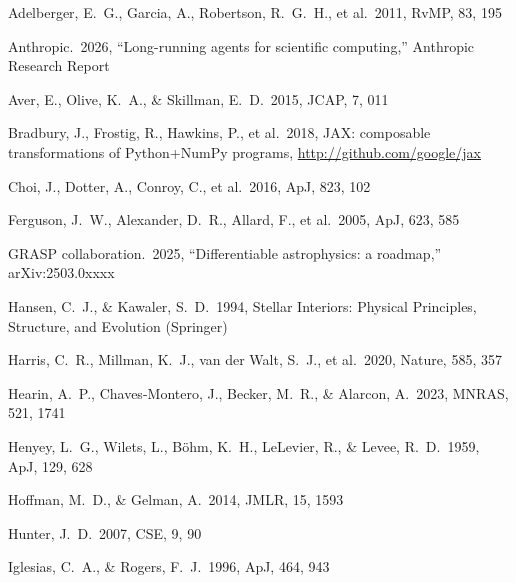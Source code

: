 \documentclass[twocolumn]{aastex631}
\begin{document}
\begin{thebibliography}{}

Adelberger, E.~G., Garcia, A., Robertson, R.~G.~H., et al.\ 2011, RvMP, 83, 195

Anthropic.\ 2026, ``Long-running agents for scientific computing,'' Anthropic Research Report

Aver, E., Olive, K.~A., \& Skillman, E.~D.\ 2015, JCAP, 7, 011

Bradbury, J., Frostig, R., Hawkins, P., et al.\ 2018, JAX: composable transformations of Python+NumPy programs, \url{http://github.com/google/jax}

Choi, J., Dotter, A., Conroy, C., et al.\ 2016, ApJ, 823, 102

Ferguson, J.~W., Alexander, D.~R., Allard, F., et al.\ 2005, ApJ, 623, 585

GRASP collaboration.\ 2025, ``Differentiable astrophysics: a roadmap,'' arXiv:2503.0xxxx

Hansen, C.~J., \& Kawaler, S.~D.\ 1994, Stellar Interiors: Physical Principles, Structure, and Evolution (Springer)

Harris, C.~R., Millman, K.~J., van der Walt, S.~J., et al.\ 2020, Nature, 585, 357

Hearin, A.~P., Chaves-Montero, J., Becker, M.~R., \& Alarcon, A.\ 2023, MNRAS, 521, 1741

Henyey, L.~G., Wilets, L., B\"ohm, K.~H., LeLevier, R., \& Levee, R.~D.\ 1959, ApJ, 129, 628

Hoffman, M.~D., \& Gelman, A.\ 2014, JMLR, 15, 1593

Hunter, J.~D.\ 2007, CSE, 9, 90

Iglesias, C.~A., \& Rogers, F.~J.\ 1996, ApJ, 464, 943


\end{thebibliography}
\end{document}
